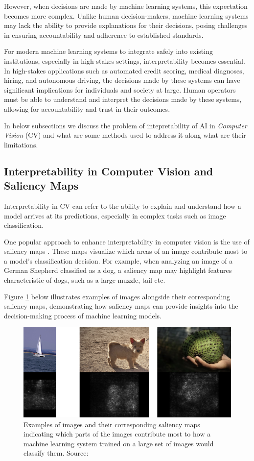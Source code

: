 However, when decisions are made by machine learning systems, this expectation becomes more complex. Unlike human decision-makers, machine learning systems may lack the ability to provide explanations for their decisions, posing challenges in ensuring accountability and adherence to established standards.

For modern machine learning systems to integrate safely into existing institutions, especially in high-stakes settings, interpretability becomes essential.  In high-stakes applications such as automated credit scoring, medical diagnoses, hiring, and autonomous driving, the decisions made by these systems can have significant implications for individuals and society at large. Human operators must be able to understand and interpret the decisions made by these systems, allowing for accountability and trust in their outcomes.

In below subsections we discuss the problem of intepretability of AI in \textit{Computer Vision} (CV) and what are some methods used to address it along what are their limitations. 


\subsection{Interpretability in Computer Vision and Saliency Maps}

Interpretability in CV can refer to the ability to explain and understand how a model arrives at its predictions, especially in complex tasks such as image classification.

One popular approach to enhance interpretability in computer vision is the use of saliency maps \cite{saliency}. These maps visualize which areas of an image contribute most to a model's classification decision. For example, when analyzing an image of a German Shepherd classified as a dog, a saliency map may highlight features characteristic of dogs, such as a large muzzle, tail etc.

Figure \ref{fig: saliency_map} below illustrates examples of images alongside their corresponding saliency maps, demonstrating how saliency maps can provide insights into the decision-making process of machine learning models. 

\begin{figure}[htbp]
  \centering
  \includegraphics[width=\textwidth]{./Figures/saliency.png}
  \caption{Examples of images and their corresponding saliency maps indicating which parts of the images contribute most to how a machine learning system trained on a large set of images would classify them. Source: \cite{simonyan2014deep}}
  \label{fig: saliency_map}
\end{figure}

